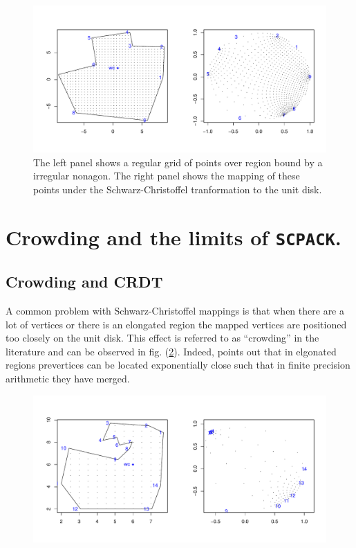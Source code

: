 \documentclass[a4paper,10pt]{amsart}
\newcommand{\sch}{Schwarz-Christoffel }
\begin{document}
\begin{figure} [tbp]
\centering
\includegraphics[scale=0.5]{figs/irregulardomain.pdf}
\caption{The left panel shows a regular grid of points over region bound by a irregular nonagon. The right panel shows the mapping of these points under the \sch tranformation to the unit disk.}
\label{irregdomain}
\end{figure}


\section{Crowding and the limits of \texttt{SCPACK}.}

\subsection{Crowding and CRDT}

A common problem with \sch mappings is that when there are a lot of vertices or there is an elongated region the mapped vertices are positioned too closely on the unit disk. This effect is referred to as ``crowding'' in the literature and can be observed in fig. (\ref{crowdeddisk}). Indeed, \cite{howell90} points out that in elgonated regions prevertices can be located exponentially close such that in finite precision arithmetic they have merged.



\begin{figure} [tbp]
\centering
\includegraphics[scale=0.5]{figs/crowdeddisk.pdf}
\caption{}
\label{crowdeddisk}
\end{figure}
\end{document}
